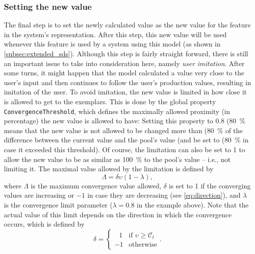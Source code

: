 
\subsubsection{Setting the new value}
\label{subsubsec:setting_the_new_value}

The final step is to set the newly calculated value as the new value for the feature in the system's representation.
After this step, this new value will be used whenever this feature is used by a system using this model (as shown in \cref{subsec:extended_sds}).
Although this step is fairly straight forward, there is still an important issue to take into consideration here, namely \textit{user imitation}.
After some turns, it might happen that the model calculated a value very close to the user's input and then continues to follow the user's production values, resulting in imitation of the user.
To avoid imitation, the new value is limited in how close it is allowed to get to the exemplars.
This is done by the global property \texttt{ConvergenceThreshold}, which defines the maximally allowed proximity (in percentage) the new value is allowed to have:
Setting this property to 0.8 (\SI{80}{\percent} means that the new value is not allowed to be changed more than (\SI{80}{\percent} of the difference between the current value and the pool's value (and be set to (\SI{80}{\percent} in case it exceeded this threshold).
Of course, the limitation can also be set to 1 to allow the new value to be as similar as \SI{100}{\percent} to the pool's value -- i.e., not limiting it.
The maximal value allowed by the limitation is defined by
%
\begin{equation}
	\label{eq:conv_limit}
	\Lambda = \delta \upsilon \left(1 - \lambda \right),
\end{equation}
\noindent
%
where $\Lambda$ is the maximum convergence value allowed, $\delta$ is set to 1 if the converging values are increasing or $-1$ in case they are decreasing (see \cref{eq:direction}), and $\lambda$ is the convergence limit parameter ($\lambda=0.8$ in the example above).
\noindent
Note that the actual value of this limit depends on the direction in which the convergence occurs, which is defined by
%
\begin{equation}
	\label{eq:direction}
	\delta = 		
	\begin{cases}
		\ \ \ 1 & \text{if } \upsilon \geq \mathcal{C}_t\\
		-1 & \text{otherwise}
	\end{cases}.
\end{equation}
